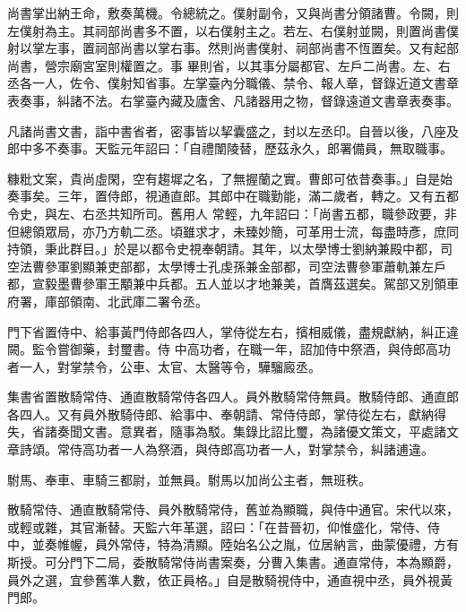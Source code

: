 \begin{pinyinscope}
 尚書掌出納王命，敷奏萬機。令總統之。僕射副令，又與尚書分領諸曹。令闕，則左僕射為主。其祠部尚書多不置，以右僕射主之。若左、右僕射並闕，則置尚書僕射以掌左事，置祠部尚書以掌右事。然則尚書僕射、祠部尚書不恆置矣。又有起部尚書，營宗廟宮室則權置之。事
 畢則省，以其事分屬都官、左戶二尚書。左、右丞各一人，佐令、僕射知省事。左掌臺內分職儀、禁令、報人章，督錄近道文書章表奏事，糾諸不法。右掌臺內藏及廬舍、凡諸器用之物，督錄遠道文書章表奏事。



 凡諸尚書文書，詣中書省者，密事皆以挈囊盛之，封以左丞印。自晉以後，八座及郎中多不奏事。天監元年詔曰：「自禮闈陵替，歷茲永久，郎署備員，無取職事。



 糠粃文案，貴尚虛閑，空有趨墀之名，了無握蘭之實。曹郎可依昔奏事。」自是始奏事矣。三年，置侍郎，視通直郎。其郎中在職勤能，滿二歲者，轉之。又有五都令史，與左、右丞共知所司。舊用人
 常輕，九年詔曰：「尚書五都，職參政要，非但總領眾局，亦乃方軌二丞。頃雖求才，未臻妙簡，可革用士流，每盡時彥，庶同持領，秉此群目。」於是以都令史視奉朝請。其年，以太學博士劉納兼殿中都，司空法曹參軍劉顯兼吏部都，太學博士孔虔孫兼金部都，司空法曹參軍蕭軌兼左戶都，宣毅墨曹參軍王顒兼中兵都。五人並以才地兼美，首膺茲選矣。駕部又別領車府署，庫部領南、北武庫二署令丞。



 門下省置侍中、給事黃門侍郎各四人，掌侍從左右，擯相威儀，盡規獻納，糾正違闕。監令嘗御藥，封璽書。侍
 中高功者，在職一年，詔加侍中祭酒，與侍郎高功者一人，對掌禁令，公車、太官、太醫等令，驊騮廄丞。



 集書省置散騎常侍、通直散騎常侍各四人。員外散騎常侍無員。散騎侍郎、通直郎各四人。又有員外散騎侍郎、給事中、奉朝請、常侍侍郎，掌侍從左右，獻納得失，省諸奏聞文書。意異者，隨事為駁。集錄比詔比璽，為諸優文策文，平處諸文章詩頌。常侍高功者一人為祭酒，與侍郎高功者一人，對掌禁令，糾諸逋違。



 駙馬、奉車、車騎三都尉，並無員。駙馬以加尚公主者，無班秩。



 散騎常侍、通直散騎常侍、員外散騎常侍，舊並為顯職，與侍中通官。宋代以來，或輕或雜，其官漸替。天監六年革選，詔曰：「在昔晉初，仰惟盛化，常侍、侍中，並奏帷幄，員外常侍，特為清顯。陸始名公之胤，位居納言，曲蒙優禮，方有斯授。可分門下二局，委散騎常侍尚書案奏，分曹入集書。通直常侍，本為顯爵，員外之選，宜參舊準人數，依正員格。」自是散騎視侍中，通直視中丞，員外視黃門郎。




\end{pinyinscope}
